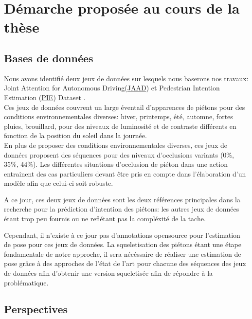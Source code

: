 \clearpage
\chapter{Démarche proposée au cours de la thèse}
\label{sec:SOTA}

\section{Bases de données}
Nous avons identifié deux jeux de données sur lesquels nous baserons nos travaux:
Joint Attention for Autonomous Driving(\href{http://jaad-explore.nvision2.eecs.yorku.ca/}{JAAD}) \cite{2016arXiv160904741K,Rasouli_2017_ICCV} et Pedestrian Intention Estimation (\href{https://data.nvision2.eecs.yorku.ca/PIE_dataset/}{PIE}) Dataset \cite{Rasouli2019PIE}.\\

Ces jeux de données couvrent un large éventail d'apparences de piétons pour des conditions environnementales diverses: hiver, printemps, été, automne, fortes pluies, brouillard, pour des niveaux de luminosité et de contraste différents en fonction de la position du soleil dans la journée.\\

En plus de proposer des conditions environnementales diverses, ces jeux de données proposent des séquences pour des niveaux d'occlusions variants (0\%, 35\%, 44\%). Les différentes situations d'occlusion de piéton dans une action entrainent des cas particuliers devant être pris en compte dans l'élaboration d'un modèle afin que celui-ci soit robuste.

A ce jour, ces deux jeux de données sont les deux références principales dans la recherche pour la prédiction d'intention des piétons: les autres jeux de données étant trop peu fournis ou ne reflétant pas la compléxité de la tache.

Cependant, il n'existe à ce jour pas d'annotations opensource pour l'estimation de pose pour ces jeux de données. La squeletisation des piétons étant une étape fondamentale de notre approche, il sera nécéssaire de réaliser une estimation de pose grâce à des approches de l'état de l'art pour chacune des séquences des jeux de données afin d'obtenir une version  squeletisée afin de répondre à la problématique.


\section{Perspectives}

